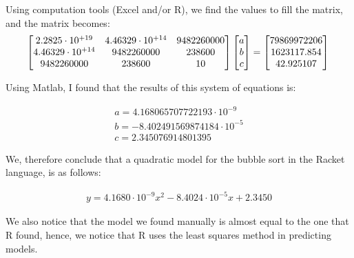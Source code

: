 \documentclass[]{report}
\begin{document}
				Using computation tools (Excel and/or R), we find the values to fill the matrix, and the matrix becomes:
				\\
				\begin{equation}
						\begin{bmatrix}
						2.2825 \cdot 10^{+19} & 4.46329\cdot 10^{+14} & 9482260000 \\
						4.46329\cdot 10^{+14} & 9482260000 & 238600 \\
						9482260000 & 238600 & 10 \\
						\end{bmatrix}
						\begin{bmatrix}
						a \\
						b \\
						c \\
						\end{bmatrix}
						=
						\begin{bmatrix}
						79869972206 \\
						1623117.854 \\
						42.925107 \\
						\end{bmatrix} \\
				\end{equation}				
		 		
		 		Using Matlab, I found that the results of this system of equations is:
		 		
		 		\begin{equation}
		 			\begin{align}
						a = 4.168065707722193\cdot10^{-9}\\
						b = -8.402491569874184\cdot10^{-5}\\
						c = 2.345076914801395
		 			\end{align}
				\end{equation}
				
				We, therefore conclude that a quadratic model for the bubble sort in the Racket language, is as follows:
				
				\begin{ceqn}
					\begin{align}
		 				y = 4.1680\cdot10^{-9}x^2 -8.4024\cdot10^{-5}x +2.3450
					\end{align}
				\end{ceqn}
				
				We also notice that the model we found manually is almost equal to the one that R found, hence, we notice that R uses the least squares method in predicting models.
\end{document}
